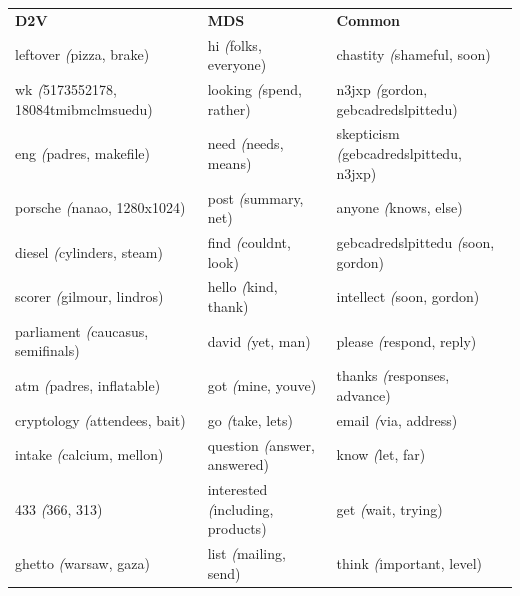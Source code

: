 \begin{table}[]
	\scriptsize
	\begin{tabular}{lll}
		\textbf{D2V}                                    & \textbf{MDS}                              & \textbf{Common}                                     \\
		leftover \textit({pizza, brake)}                & hi \textit({folks, everyone)}             & chastity \textit({shameful, soon)}                  \\
		wk \textit({5173552178, 18084tmibmclmsuedu)}    & looking \textit({spend, rather)}          & n3jxp \textit({gordon, gebcadredslpittedu)}         \\
		eng \textit({padres, makefile)}                 & need \textit({needs, means)}              & skepticism \textit({gebcadredslpittedu, n3jxp)}     \\
		porsche \textit({nanao, 1280x1024)}             & post \textit({summary, net)}              & anyone \textit({knows, else)}                       \\
		diesel \textit({cylinders, steam)}              & find \textit({couldnt, look)}             & gebcadredslpittedu \textit({soon, gordon)}          \\
		scorer \textit({gilmour, lindros)}              & hello \textit({kind, thank)}              & intellect \textit({soon, gordon)}                   \\
		parliament \textit({caucasus, semifinals)}      & david \textit({yet, man)}                 & please \textit({respond, reply)}                    \\
		atm \textit({padres, inflatable)}               & got \textit({mine, youve)}                & thanks \textit({responses, advance)}                \\
		cryptology \textit({attendees, bait)}           & go \textit({take, lets)}                  & email \textit({via, address)}                       \\
		intake \textit({calcium, mellon)}               & question \textit({answer, answered)}      & know \textit({let, far)}                            \\
		433 \textit({366, 313)}                         & interested \textit({including, products)} & get \textit({wait, trying)}                         \\
		ghetto \textit({warsaw, gaza)}                  & list \textit({mailing, send)}             & think \textit({important, level)}                   \\

\end{tabular}
\end{table}
